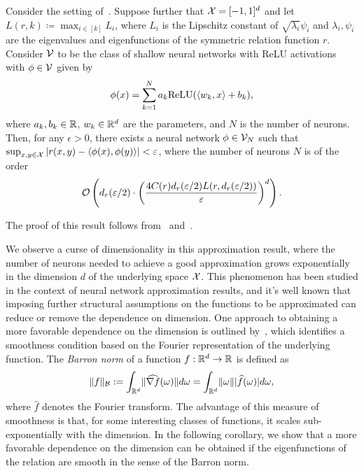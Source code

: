 \begin{corollary}\label{cor:sym_iprod_kernel_neuron_bound}
	Consider the setting of~. Suppose further that ${\mathcal{X}} = [-1, 1]^d$ and let $L(r, k) \coloneq \max_{i \in [k]} L_i$, where $L_i$ is the Lipschitz constant of $\sqrt{\lambda_i} \psi_i$ and $\lambda_i, \psi_i$ are the eigenvalues and eigenfunctions of the symmetric relation function $r$. Consider ${\mathcal{V}}$ to be the class of shallow neural networks with ReLU activations with $\phi \in {\mathcal{V}}$ given by
	\begin{equation*}
		\phi(x) = \sum_{k=1}^{N} a_k \mathrm{ReLU}(\left \langle w_k, x \right\rangle + b_k),
	\end{equation*}
	where $a_k, b_k \in \mathbb{R}$, $w_k \in \mathbb{R}^{d}$ are the parameters, and $N$ is the number of neurons. Then, for any $\epsilon > 0$, there exists a neural network $\phi \in {\mathcal{V}}_N$ such that $\sup_{x,y \in \mathcal{X}}{\left\lvert r(x,y) - \left \langle \phi(x), \phi(y) \right\rangle\right\rvert} < \varepsilon$, where the number of neurons $N$ is of the order
	\[{\mathcal{O}}\left(d_r(\varepsilon / 2) \cdot \left(\frac{4 C(r) d_r(\varepsilon / 2) L(r, d_r(\varepsilon/2))}{\varepsilon}\right)^{d}\right).\]
\end{corollary}
The proof of this result follows from~ and~\textcite{bachBreakingCurseDimensionality2016}.

We observe a curse of dimensionality in this approximation result, where the number of neurons needed to achieve a good approximation grows exponentially in the dimension $d$ of the underlying space ${\mathcal{X}}$. This phenomenon has been studied in the context of neural network approximation results, and it's well known that imposing further structural assumptions on the functions to be approximated can reduce or remove the dependence on dimension. One approach to obtaining a more favorable dependence on the dimension is outlined by~\textcite{barronUniversalApproximation1993}, which identifies a smoothness condition based on the Fourier representation of the underlying function.  The \textit{Barron norm} of a function $f: \mathbb{R}^d \to \mathbb{R}$ is defined as
\[\lVert f\rVert_{{\mathcal{B}}} := \int_{\mathbb{R}^d} \lVert\widehat{\nabla f}(\omega)\rVert d\omega = \int_{\mathbb{R}^d} \lVert\omega\rVert \lvert\widehat{f}(\omega)\rvert d \omega,\]
where $\hat{f}$ denotes the Fourier transform. The advantage of this measure of smoothness is that, for some interesting classes of functions, it scales sub-exponentially with the dimension. In the following corollary, we show that a more favorable dependence on the dimension can be obtained if the eigenfunctions of the relation are smooth in the sense of the Barron norm.

